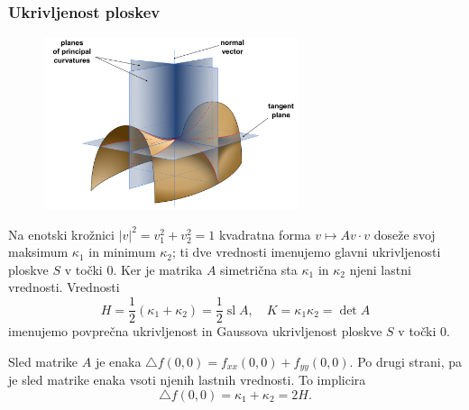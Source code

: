 \documentclass[8pt]{beamer}
\theoremstyle{definition}
\theoremstyle{remark}
\theoremstyle{plain}
\numberwithin{equation}{section}  %
\begin{document}
\begin{frame}
    \frametitle{Ukrivljenost ploskev}

    \begin{figure}
        \includegraphics[width=20em]{../Slike/Minimal_surface_curvature_planes.pdf}
    \end{figure}

    Na enotski krožnici $|v|^2=v_1^2+v_2^2=1$ kvadratna forma $v \mapsto A v \cdot v$ doseže svoj maksimum $\kappa_1$ in minimum $\kappa_2$; ti dve vrednosti imenujemo \textcolor{red1}{glavni ukrivljenosti} ploskve $S$ v točki $0$. Ker je matrika $A$ simetrična sta $\kappa_1$ in $\kappa_2$ njeni lastni vrednosti. Vrednosti 
    \begin{equation*}
        H=\frac{1}{2}(\kappa_1+\kappa_2)=\frac{1}{2}\operatorname{sl} A, \quad K=\kappa_1 \kappa_2=\operatorname{det} A
    \end{equation*}
    imenujemo \textcolor{red1}{povprečna ukrivljenost} in \textcolor{red1}{Gaussova ukrivljenost} ploskve $S$ v točki $0$. 
    \pause 
    \vspace{0.8em}

    Sled matrike $A$ je enaka $\bigtriangleup f(0,0)=f_{x x}(0,0)+f_{y y}(0,0)$. Po drugi strani, pa je sled matrike enaka vsoti njenih lastnih vrednosti. To implicira 
    \begin{equation*}
        \bigtriangleup f(0,0)=\kappa_1+\kappa_2=2H.
    \end{equation*}

\end{frame}
\end{document}
